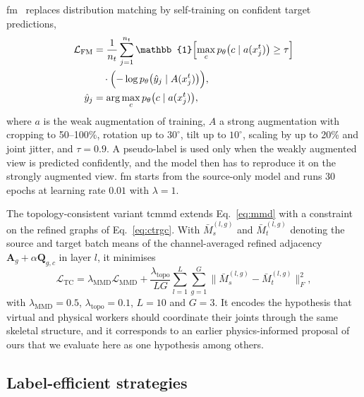 \documentclass[Royal,sagev,times]{sagej}
\begin{document}
\ac{fm}~\cite{sohn2020fixmatch} replaces distribution matching by
self-training on confident target predictions,
\begin{equation}
  \begin{aligned}
  \mathcal{L}_{\mathrm{FM}}
    &=\frac{1}{n_t}\sum_{j=1}^{n_t}
      \mathbb{1}\Bigl[\max_c p_\theta\bigl(c\mid a(x_j^t)\bigr)\ge\tau\Bigr]\\
    &\quad\cdot\Bigl(-\log p_\theta\bigl(\hat{y}_j\mid A(x_j^t)\bigr)\Bigr),\\
  \hat{y}_j&=\arg\max_c p_\theta\bigl(c\mid a(x_j^t)\bigr),
  \end{aligned}
  \label{eq:fm}
\end{equation}
where $a$ is the weak augmentation of training, $A$ a strong augmentation with
cropping to 50--100\%, rotation up to $30^\circ$, tilt up to $10^\circ$,
scaling by up to 20\% and joint jitter, and $\tau=0.9$. A pseudo-label is used
only when the weakly augmented view is predicted confidently, and the model
then has to reproduce it on the strongly augmented view. \ac{fm} starts from
the source-only model and runs 30 epochs at learning rate $0.01$ with
$\lambda=1$.

The topology-consistent variant \ac{tcmmd} extends Eq.~\ref{eq:mmd} with a
constraint on the refined graphs of Eq.~\ref{eq:ctrgc}. With
$\bar{M}^{(l,g)}_s$ and $\bar{M}^{(l,g)}_t$ denoting the source and target
batch means of the channel-averaged refined adjacency
$\mathbf{A}_g+\alpha\mathbf{Q}_{g,c}$ in layer $l$, it minimises
\begin{equation}
  \mathcal{L}_{\mathrm{TC}}=\lambda_{\mathrm{MMD}}\mathcal{L}_{\mathrm{MMD}}
  +\frac{\lambda_{\mathrm{topo}}}{LG}\sum_{l=1}^{L}\sum_{g=1}^{G}
  \bigl\|\bar{M}^{(l,g)}_s-\bar{M}^{(l,g)}_t\bigr\|_F^2,
  \label{eq:tc}
\end{equation}
with $\lambda_{\mathrm{MMD}}=0.5$, $\lambda_{\mathrm{topo}}=0.1$, $L=10$ and
$G=3$. It encodes the hypothesis that virtual and physical workers should
coordinate their joints through the same skeletal structure, and it corresponds
to an earlier physics-informed proposal of ours that we evaluate here as one
hypothesis among others.

\subsection{Label-efficient strategies}
\end{document}
